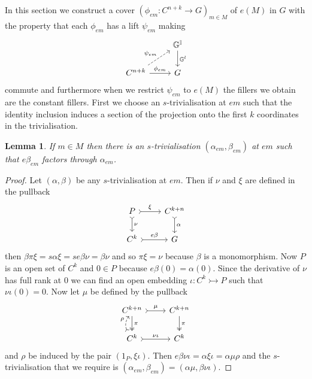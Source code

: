 \documentclass[pdftex]{sigma}
\numberwithin{equation}{section}
\newtheorem{Lemma}[Theorem]{Lemma}
\begin{document}
In this section we construct a cover $(\phi_{em}\colon C^{n+k} \rightarrow G)_{m\in M}$ of $e(M)$ in $G$ with the property that each $\phi_{em}$ has a lift $\psi_{em}$ making
\begin{equation*}
 \begin{tikzcd}
 {} & \mathbb{G}^{\mathbb{I}} \dar{\mathbb{G}^{l}}\\
 C^{n+k} \urar[dashed]{\psi_{em}} \rar{\phi_{em}} & G
 \end{tikzcd}
\end{equation*}
commute and furthermore when we restrict $\psi_{em}$ to $e(M)$ the f\/illers we obtain are the constant f\/illers.
First we choose an $s$-trivialisation at $em$ such that the identity inclusion induces a section of the projection onto the f\/irst $k$ coordinates in the trivialisation.

\begin{Lemma}\label{lemma:trivialisation-with-identities-included}
If $m\in M$ then there is an $s$-trivialisation $(\alpha_{em},\beta_{em})$ at $em$ such that $e \beta_{em}$ factors through $\alpha_{em}$.
\end{Lemma}
\begin{proof}Let $(\alpha,\beta)$ be any $s$-trivialisation at $em$. Then if $\nu$ and $\xi$ are def\/ined in the pullback
\begin{equation*}\begin{tikzcd}
P \dar[rightarrowtail]{\nu} \rar[rightarrowtail]{\xi} & C^{k+n}\dar[rightarrowtail]{\alpha} \\
C^{k} \rar[rightarrowtail]{e\beta} & G
\end{tikzcd}\end{equation*}
then $\beta\pi\xi=s\alpha\xi=se\beta\nu=\beta\nu$ and so $\pi\xi=\nu$ because $\beta$ is a monomorphism. Now $P$ is an open set of $C^{k}$ and $0\in P$ because $e\beta(0)=\alpha(0)$. Since the derivative of $\nu$ has full rank at $0$ we can f\/ind an open embedding $\iota\colon C^{k}\rightarrowtail P$ such that $\nu\iota(0)=0$. Now let $\mu$ be def\/ined by the pullback
\begin{equation*}\begin{tikzcd}
C^{k+n} \dar[twoheadrightarrow]{\pi} \rar[rightarrowtail]{\mu} & C^{k+n}\dar[twoheadrightarrow]{\pi} \\
C^{k}\rar[rightarrowtail]{\nu\iota} \uar[bend left,dashed,rightarrowtail]{\rho} & C^{k}
\end{tikzcd}\end{equation*}
and $\rho$ be induced by the pair $(1_{P},\xi\iota)$. Then $e\beta\nu\iota=\alpha\xi\iota=\alpha\mu\rho$ and the $s$-trivialisation that we require is $(\alpha_{em},\beta_{em})=(\alpha\mu,\beta\nu\iota)$.
\end{proof}
\end{document}
